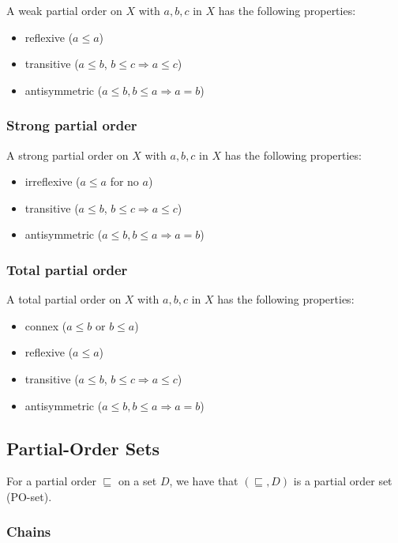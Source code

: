 \documentclass[a4paper, 12pt, twoside]{article}
\begin{document}
A weak partial order on $X$ with $a, b, c$ in $X$ 
has the following properties: \begin{itemize}
  \item reflexive ($a \leq a$)
  \item transitive ($a \leq b$, $b \leq c \Rightarrow a \leq c$)
  \item antisymmetric ($a \leq b, b \leq a \Rightarrow a = b$)
\end{itemize}

\subsubsection{Strong partial order}

A strong partial order on $X$ with $a, b, c$ in $X$ 
has the following properties: \begin{itemize}
  \item irreflexive ($a \leq a$ for no $a$)
  \item transitive ($a \leq b$, $b \leq c \Rightarrow a \leq c$)
  \item antisymmetric ($a \leq b, b \leq a \Rightarrow a = b$)
\end{itemize}

\subsubsection{Total partial order}

A total partial order on $X$ with $a, b, c$ in $X$ 
has the following properties: \begin{itemize}
  \item connex ($a \leq b$ or $b \leq a$)
  \item reflexive ($a \leq a$)
  \item transitive ($a \leq b$, $b \leq c \Rightarrow a \leq c$)
  \item antisymmetric ($a \leq b, b \leq a \Rightarrow a = b$)
\end{itemize}

\subsection{Partial-Order Sets}

For a partial order $\sqsubseteq$ on a set $D$, we have that
$(\sqsubseteq, D)$ is a partial order set (PO-set).

\subsubsection{Chains}
\end{document}
